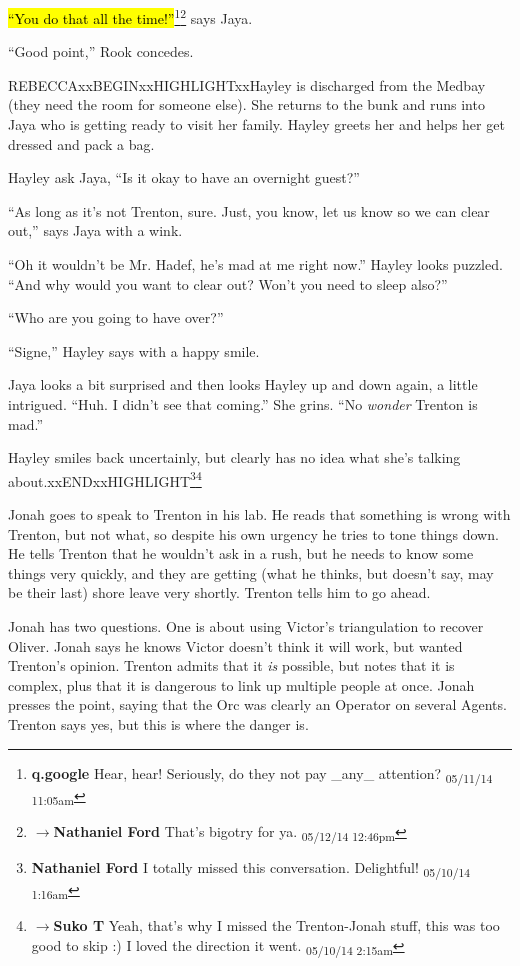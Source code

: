 \hl{``You do that all the time!''}\footnote{\textbf{q.google }Hear, hear!  Seriously, do they not pay \_any\_ attention? \textsubscript{05/11/14 11:05am}}\footnote{$\rightarrow$\textbf{Nathaniel Ford }That's bigotry for ya. \textsubscript{05/12/14 12:46pm}} says Jaya.

``Good point,'' Rook concedes.



REBECCAxxBEGINxxHIGHLIGHTxxHayley is discharged from the Medbay (they need the room for someone else).  She returns to the bunk and runs into Jaya who is getting ready to visit her family.  Hayley greets her and helps her get dressed and pack a bag.

Hayley ask Jaya, ``Is it okay to have an overnight guest?''

``As long as it's not Trenton, sure.  Just, you know, let us know so we can clear out,'' says Jaya with a wink.

``Oh it wouldn't be Mr. Hadef, he's mad at me right now.''  Hayley looks puzzled.  ``And why would you want to clear out?  Won't you need to sleep also?''

``Who are you going to have over?''

``Signe,'' Hayley says with a happy smile.

Jaya looks a bit surprised and then looks Hayley up and down again, a little intrigued.  ``Huh.  I didn't see that coming.''  She grins.  ``No \textit{wonder} Trenton is mad.''

Hayley smiles back uncertainly, but clearly has no idea what she's talking about.xxENDxxHIGHLIGHT\footnote{\textbf{Nathaniel Ford }I totally missed this conversation. Delightful! \textsubscript{05/10/14 1:16am}}\footnote{$\rightarrow$\textbf{Suko T }Yeah, that's why I missed the Trenton-Jonah stuff, this was too good to skip :)  I loved the direction it went. \textsubscript{05/10/14 2:15am}}



Jonah goes to speak to Trenton in his lab.  He reads that something is wrong with Trenton, but not what, so despite his own urgency he tries to tone things down.  He tells Trenton that he wouldn't ask in a rush, but he needs to know some things very quickly, and they are getting (what he thinks, but doesn't say, may be their last) shore leave very shortly.  Trenton tells him to go ahead.

Jonah has two questions.  One is about using Victor's triangulation to recover Oliver.  Jonah says he knows Victor doesn't think it will work, but wanted Trenton's opinion.  Trenton admits that it \textit{is} possible, but notes that it is complex, plus that it is dangerous to link up multiple people at once.  Jonah presses the point, saying that the Orc was clearly an Operator on several Agents.  Trenton says yes, but this is where the danger is.

